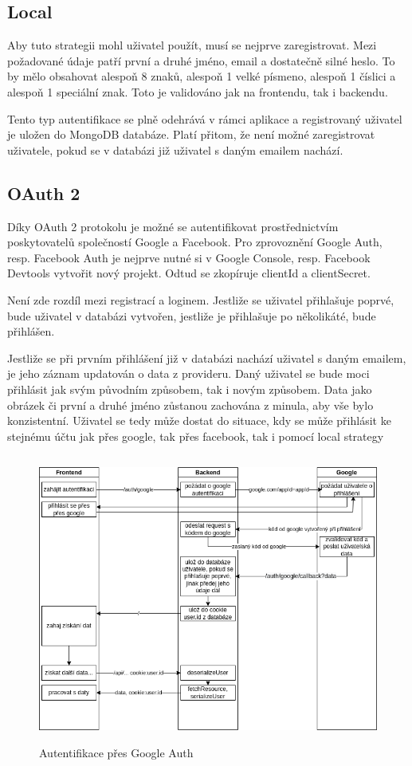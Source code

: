 \documentclass[a4paper,oneside,12pt]{report}
\begin{document}
\subsection{Local}
Aby tuto strategii mohl uživatel použít, musí se nejprve zaregistrovat. Mezi požadované údaje patří první a druhé jméno, email a dostatečně silné heslo. To by mělo obsahovat alespoň 8 znaků, alespoň 1 velké písmeno, alespoň 1 číslici a alespoň 1 speciální znak. Toto je validováno jak na frontendu, tak i backendu. 

Tento typ autentifikace se plně odehrává v rámci aplikace a registrovaný uživatel je uložen do MongoDB databáze. Platí přitom, že není možné zaregistrovat uživatele, pokud se v databázi již uživatel s daným emailem nachází. 

\subsection{OAuth 2}

Díky OAuth 2 protokolu je možné se autentifikovat prostřednictvím poskytovatelů společností Google a Facebook. Pro zprovoznění Google Auth, resp. Facebook Auth je nejprve nutné si v Google Console, resp. Facebook Devtools vytvořit nový projekt. Odtud se zkopíruje clientId a clientSecret.

Není zde rozdíl mezi registrací a loginem. Jestliže se uživatel přihlašuje poprvé, bude uživatel v databázi vytvořen, jestliže je přihlašuje po několikáté, bude přihlášen. 

Jestliže se při prvním přihlášení již v databázi nachází uživatel s daným emailem, je jeho záznam updatován o data z provideru. Daný uživatel se bude moci přihlásit jak svým původním způsobem, tak i novým způsobem. Data jako obrázek či první a druhé jméno zůstanou zachována z minula, aby vše bylo konzistentní. Uživatel se tedy může dostat do situace, kdy se může přihlásit ke stejnému účtu jak přes google, tak přes facebook, tak i pomocí local strategy

\begin{figure}[H]
   \centering
   \includegraphics[height=9.5cm]{../img/googleAuth.png}
   \caption[Autentifikace přes Google Auth]{Autentifikace přes Google Auth}
   \label{fig:architecture}
\end{figure}
\end{document}
